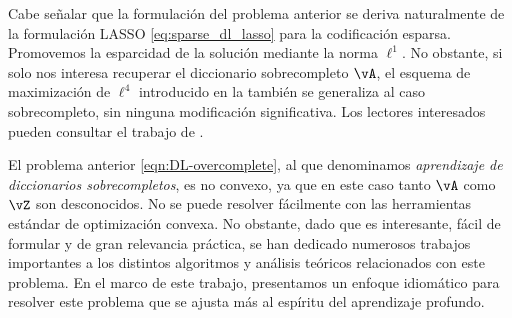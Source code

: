 \documentclass[../../book-main.tex]{subfiles}
\begin{document}
\begin{remark}
    Cabe señalar que la formulación del problema anterior se deriva naturalmente de la formulación LASSO
    \eqref{eq:sparse_dl_lasso} para la codificación esparsa. Promovemos la
    esparcidad de la solución mediante la norma \(\ell^1\).
    No obstante, si solo nos interesa recuperar el
    diccionario sobrecompleto \(\vA\), el esquema de maximización de \(\ell^4\)
    introducido en la  también
    se generaliza al caso sobrecompleto, sin ninguna
    modificación significativa. Los lectores interesados pueden consultar el
    trabajo de \cite{Qu2020Geometric}.
\end{remark}

El problema anterior \eqref{eqn:DL-overcomplete}, al que denominamos
\textit{aprendizaje de diccionarios sobrecompletos}, es no convexo, ya que en este caso
tanto \(\vA\) como \(\vZ\) son desconocidos. No se puede resolver fácilmente con las 
herramientas estándar de optimización convexa. No obstante, dado que es interesante,
fácil de formular y de gran relevancia práctica, se han dedicado numerosos trabajos importantes a
los distintos algoritmos y análisis teóricos relacionados con este problema.
En el marco de este trabajo, presentamos un enfoque idiomático para resolver este problema
que se ajusta más al espíritu del aprendizaje profundo.
\end{document}
